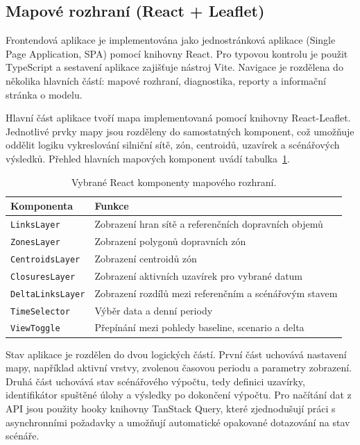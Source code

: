 \subsection{Mapové rozhraní (React + Leaflet)}
\label{sec:impl-frontend-map}

Frontendová aplikace je implementována jako jednostránková aplikace (Single Page Application, SPA) pomocí knihovny React. Pro typovou kontrolu je použit TypeScript a sestavení aplikace zajišťuje nástroj Vite. Navigace je rozdělena do několika hlavních částí: mapové rozhraní, diagnostika, reporty a informační stránka o modelu.

Hlavní část aplikace tvoří mapa implementovaná pomocí knihovny React-Leaflet. Jednotlivé prvky mapy jsou rozděleny do samostatných komponent, což umožňuje oddělit logiku vykreslování silniční sítě, zón, centroidů, uzavírek a scénářových výsledků. Přehled hlavních mapových komponent uvádí tabulka~\ref{tab:map-components}.

\begin{table}[ht]
\centering
\caption{Vybrané React komponenty mapového rozhraní.}
\label{tab:map-components}
\begin{tabular}{lp{7cm}}
\toprule
\textbf{Komponenta} & \textbf{Funkce} \\
\midrule
\texttt{LinksLayer} & Zobrazení hran sítě a referenčních dopravních objemů \\
\texttt{ZonesLayer} & Zobrazení polygonů dopravních zón \\
\texttt{CentroidsLayer} & Zobrazení centroidů zón \\
\texttt{ClosuresLayer} & Zobrazení aktivních uzavírek pro vybrané datum \\
\texttt{DeltaLinksLayer} & Zobrazení rozdílů mezi referenčním a scénářovým stavem \\
\texttt{TimeSelector} & Výběr data a denní periody \\
\texttt{ViewToggle} & Přepínání mezi pohledy baseline, scenario a delta \\
\bottomrule
\end{tabular}
\end{table}

Stav aplikace je rozdělen do dvou logických částí. První část uchovává nastavení mapy, například aktivní vrstvy, zvolenou časovou periodu a parametry zobrazení. Druhá část uchovává stav scénářového výpočtu, tedy definici uzavírky, identifikátor spuštěné úlohy a výsledky po dokončení výpočtu. Pro načítání dat z API jsou použity hooky knihovny TanStack Query, které zjednodušují práci s asynchronními požadavky a umožňují automatické opakované dotazování na stav scénáře.

